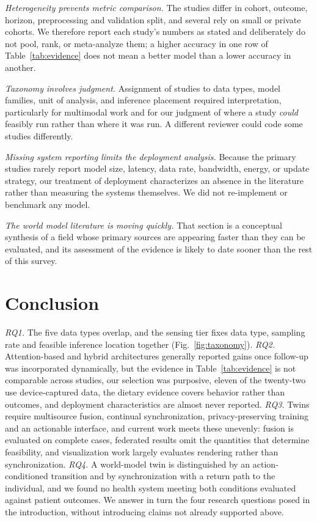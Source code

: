 \documentclass[journal]{IEEEtran}
\newif\ifsubmission
\begin{document}
\emph{Heterogeneity prevents metric comparison.} The studies differ in cohort, outcome, horizon, preprocessing and validation split, and several rely on small or private cohorts. We therefore report each study's numbers as stated and deliberately do not pool, rank, or meta-analyze them; a higher accuracy in one row of Table~\ref{tab:evidence} does not mean a better model than a lower accuracy in another.

\emph{Taxonomy involves judgment.} Assignment of studies to data types, model families, unit of analysis, and inference placement required interpretation, particularly for multimodal work and for our judgment of where a study \emph{could} feasibly run rather than where it was run. A different reviewer could code some studies differently.

\emph{Missing system reporting limits the deployment analysis.} Because the primary studies rarely report model size, latency, data rate, bandwidth, energy, or update strategy, our treatment of deployment characterizes an absence in the literature rather than measuring the systems themselves. We did not re-implement or benchmark any model.

\emph{The world model literature is moving quickly.} That section is a conceptual synthesis of a field whose primary sources are appearing faster than they can be evaluated, and its assessment of the evidence is likely to date sooner than the rest of this survey.

\fi

\section{Conclusion}
\label{sec:conclusion}
\ifsubmission
\emph{RQ1.} The five data types overlap, and the sensing tier fixes data type, sampling rate and feasible inference location together (Fig.~\ref{fig:taxonomy}). \emph{RQ2.} Attention-based and hybrid architectures generally reported gains once follow-up was incorporated dynamically, but the evidence in Table~\ref{tab:evidence} is not comparable across studies, our selection was purposive, eleven of the twenty-two use device-captured data, the dietary evidence covers behavior rather than outcomes, and deployment characteristics are almost never reported. \emph{RQ3.} Twins require multisource fusion, continual synchronization, privacy-preserving training and an actionable interface, and current work meets these unevenly: fusion is evaluated on complete cases, federated results omit the quantities that determine feasibility, and visualization work largely evaluates rendering rather than synchronization. \emph{RQ4.} A world-model twin is distinguished by an action-conditioned transition and by synchronization with a return path to the individual, and we found no health system meeting both conditions evaluated against patient outcomes.
\else
We answer in turn the four research questions posed in the introduction, without introducing claims not already supported above.
\end{document}
